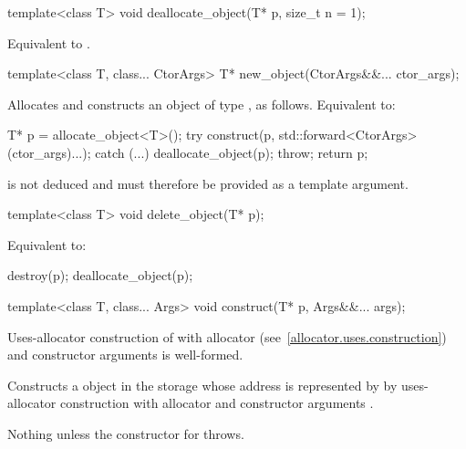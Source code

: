 %
\begin{itemdecl}
template<class T>
  void deallocate_object(T* p, size_t n = 1);
\end{itemdecl}

\begin{itemdescr}
\pnum
\effects
Equivalent to .
\end{itemdescr}

%
\begin{itemdecl}
template<class T, class... CtorArgs>
  T* new_object(CtorArgs&&... ctor_args);
\end{itemdecl}

\begin{itemdescr}
\pnum
\effects
Allocates and constructs an object of type , as follows.\newline
Equivalent to:
\begin{codeblock}
T* p = allocate_object<T>();
try {
  construct(p, std::forward<CtorArgs>(ctor_args)...);
} catch (...) {
  deallocate_object(p);
  throw;
}
return p;
\end{codeblock}

\pnum
\begin{note}
 is not deduced and must therefore be provided as a template argument.
\end{note}
\end{itemdescr}

%
\begin{itemdecl}
template<class T>
  void delete_object(T* p);
\end{itemdecl}

\begin{itemdescr}
\pnum
\effects
Equivalent to:
\begin{codeblock}
destroy(p);
deallocate_object(p);
\end{codeblock}
\end{itemdescr}

%
\begin{itemdecl}
template<class T, class... Args>
  void construct(T* p, Args&&... args);
\end{itemdecl}

\begin{itemdescr}
\pnum
\mandates
Uses-allocator construction of 
with allocator  (see~\ref{allocator.uses.construction})
and constructor arguments  is well-formed.

\pnum
\effects
Constructs a  object in the storage
whose address is represented by 
by uses-allocator construction with allocator 
and constructor arguments .

\pnum
\throws
Nothing unless the constructor for  throws.
\end{itemdescr}

